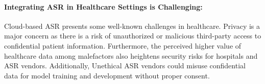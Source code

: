 \documentclass[11pt,a4paper]{article}
\begin{document}
\paragraph{Integrating ASR in Healthcare Settings is Challenging:}
 Cloud-based ASR presents some well-known challenges in healthcare. Privacy is a major concern as there is a risk of unauthorized or malicious third-party access to confidential patient information. Furthermore, the perceived higher value of healthcare data among malefactors also heightens security risks for hospitals and ASR vendors. Additionally, Unethical ASR vendors could misuse confidential data for model training and development without proper consent. 


\end{document}
